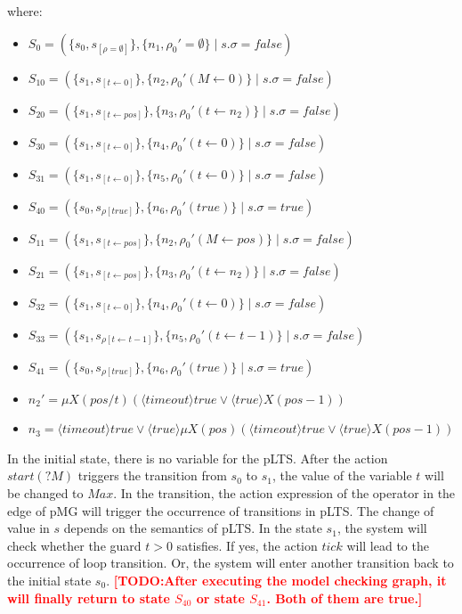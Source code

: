 \documentclass[runningheads,a4paper]{llncs}
\newcommand{\TODO}[1]{\textcolor{red}{\textbf{[TODO:#1]}}}
\begin{document}
where:
\begin{itemize}
	\item $S_{0}  = (\{s_{0},s_{[\rho=\emptyset]}\}, \{n_{1}, \rho_{0}'=\emptyset\}\;|\;s.\sigma = false)$
	\item $S_{10} = (\{s_{1},s_{[t\leftarrow 0]}\}, \{n_{2}, \rho_{0}'(M\leftarrow 0)\}\;|\;s.\sigma = false)$
	\item $S_{20} = (\{s_{1},s_{[t\leftarrow pos]}\}, \{n_{3}, \rho_{0}'(t\leftarrow n_{2})\}\;|\;s.\sigma = false)$
	\item $S_{30} = (\{s_{1},s_{[t\leftarrow 0]}\}, \{n_{4}, \rho_{0}'(t\leftarrow 0)\}\;|\;s.\sigma = false)$
	\item $S_{31} = (\{s_{1},s_{[t\leftarrow 0]}\}, \{n_{5}, \rho_{0}'(t\leftarrow 0)\}\;|\;s.\sigma = false)$
	\item $S_{40} = (\{s_{0},s_{\rho[true]}\}, \{n_{6}, \rho_{0}'(true)\}\;|\;s.\sigma = true)$
	
	\item $S_{11} = (\{s_{1},s_{[t\leftarrow pos]}\}, \{n_{2}, \rho_{0}'(M\leftarrow pos)\}\;|\;s.\sigma = false)$
	\item $S_{21} = (\{s_{1},s_{[t\leftarrow pos]}\}, \{n_{3}, \rho_{0}'(t\leftarrow n_{2})\}\;|\;s.\sigma = false)$
	\item $S_{32} = (\{s_{1},s_{[t\leftarrow 0]}\}, \{n_{4}, \rho_{0}'(t\leftarrow 0)\}\;|\;s.\sigma = false)$
	\item $S_{33} = (\{s_{1},s_{\rho[t\leftarrow t-1]}\}, \{n_{5}, \rho_{0}'(t\leftarrow t-1)\}\;|\;s.\sigma = false)$
	\item $S_{41} = (\{s_{0},s_{\rho[true]}\}, \{n_{6}, \rho_{0}'(true)\}\;|\;s.\sigma = true)$
	\item $n_{2}'=\mu X(pos/t)(\langle timeout\rangle true \vee \langle true\rangle X(pos-1))$
	\item $n_{3}=\langle timeout\rangle true \vee\langle true\rangle\mu X(pos)(\langle timeout\rangle true \vee \langle true\rangle X(pos-1))$
\end{itemize}

In the initial state, there is no variable for the pLTS. After the action $start(?M)$ triggers the transition from $s_{0}$ to $s_{1}$, the value of the variable $t$ will be changed to $Max$. In the transition, the action expression of the operator in the edge of pMG will trigger the occurrence of transitions in pLTS. The change of value in $s$ depends on the semantics of pLTS. In the state $s_{1}$, the system will check whether the guard $t>0$ satisfies. If yes, the action $tick$ will lead to the occurrence of loop transition. Or, the system will enter another transition back to the initial state $s_{0}$. \TODO{After executing the model checking graph, it will finally return to state $S_{40}$ or state $S_{41}$. Both of them are true.}
\end{document}
